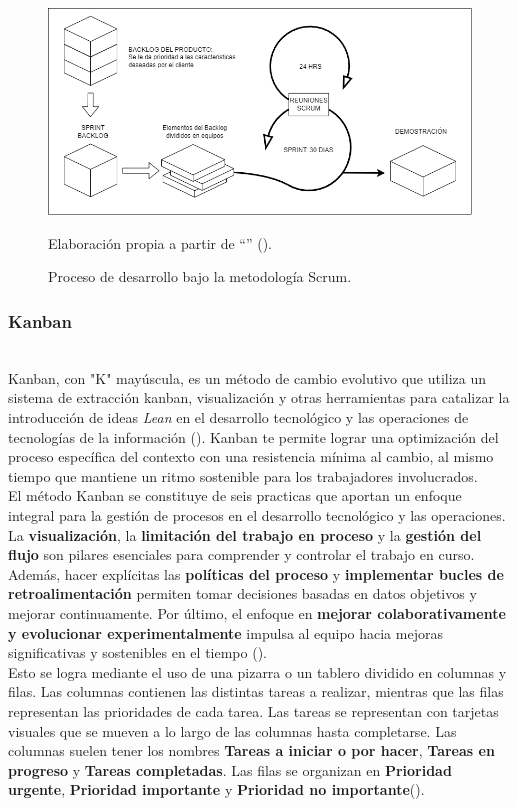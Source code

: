 \begin{figure}[H]
	\centering
	\includegraphics[width=1.0\textwidth]{images/marcoteorico/modelo_scrum.png}
	\caption{Proceso de desarrollo bajo la metodología Scrum.}
    \vspace{-0.2cm}
	\footnotesize{{Elaboración propia a partir de ``\textit{}'' (\citeyear{pressman2005software}).}}
	\label{figs:modelo_desarrollo_scrum} 
\end{figure}

\subsubsection{Kanban}\hfill\\ 
\indent
Kanban, con "K" mayúscula, es un método de cambio evolutivo que utiliza un sistema de extracción kanban, visualización y otras herramientas para catalizar la introducción de ideas \textit{Lean} en el desarrollo tecnológico y las operaciones de tecnologías de la información (\cite{anderson2010kanban}). Kanban te permite lograr una optimización del proceso específica del contexto con una resistencia mínima al cambio, al mismo tiempo que mantiene un ritmo sostenible para los trabajadores involucrados.\\ \indent
El método Kanban se constituye de seis practicas que aportan un enfoque integral para la gestión de procesos en el desarrollo tecnológico y las operaciones.  La \textbf{visualización}, la \textbf{limitación del trabajo en proceso} y la \textbf{gestión del flujo} son pilares esenciales para comprender y controlar el trabajo en curso. Además, hacer explícitas las \textbf{políticas del proceso} y \textbf{implementar bucles de retroalimentación} permiten tomar decisiones basadas en datos objetivos y mejorar continuamente. Por último, el enfoque en \textbf{mejorar colaborativamente y evolucionar experimentalmente} impulsa al equipo hacia mejoras significativas y sostenibles en el tiempo (\cite{anderson2010kanban}).\\ \indent
Esto se logra mediante el uso de una pizarra o un tablero dividido en columnas y filas. Las columnas contienen las distintas tareas a realizar, mientras que las filas representan las prioridades de cada tarea. Las tareas se representan con tarjetas visuales que se mueven a lo largo de las columnas hasta completarse. Las columnas suelen tener los nombres \textbf{Tareas a iniciar o por hacer}, \textbf{Tareas en progreso} y \textbf{Tareas completadas}. Las filas se organizan en \textbf{Prioridad urgente}, \textbf{Prioridad importante} y \textbf{Prioridad no importante}(\cite{amaru2022sistema}).

